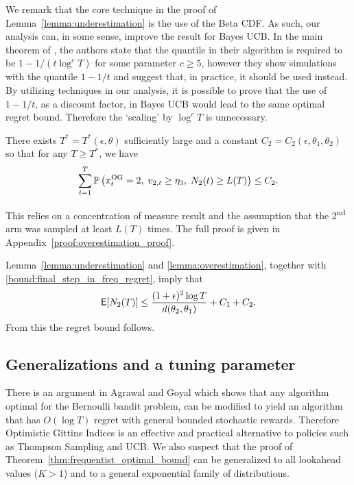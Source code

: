 \begin{myproof}[Proof.]
\begin{myproof}
		We remark that the core technique in the proof of Lemma~\ref{lemma:underestimation} is the use of the Beta CDF. As such, our analysis can, in some sense, improve the result for Bayes UCB. In the main theorem of \cite{kaufmann2012thompson}, the authors state that the quantile in their algorithm is required to be $1 - 1/(t \log^c T)$ for some parameter $c \ge 5$, however they show simulations with the quantile $1 -1/t$ and suggest that, in practice, it should be used instead. By utilizing techniques in our analysis, it is possible to prove that the use of $1-1/t$, as a discount factor, in Bayes UCB would lead to the same optimal regret bound. Therefore the `scaling' by $\log^c T$ is unnecessary.
	\end{myproof}
	\begin{lemma} \label{lemma:overestimation}
		There exists $T^* = T^*(\epsilon, \theta)$ sufficiently large and a constant $C_2 = C_2(\epsilon, \theta_1, \theta_2)$ so that for any $T \ge T^*$, we have
		\begin{equation*}
		\sum_{t=1}^T \P{\pi_t^{\rm OG} = 2,\; v_{2,t} \ge \eta_3, \; N_2(t) \ge L(T)} \le C_2.
		\end{equation*}
	\end{lemma}
	\begin{myproof}
		This relies on a concentration of measure result and the assumption that the 2\textsuperscript{nd} arm was sampled at least $L(T)$ times. The full proof is given in Appendix~\ref{proof:overestimation_proof}.
	\end{myproof}
	Lemma~\ref{lemma:underestimation} and \ref{lemma:overestimation}, together with \eqref{bound:final_step_in_freq_regret}, imply that
	\[
	\E[N_2(T)] \le \frac{(1+\epsilon)^2 \log T}{d(\theta_2, \theta_1)} +  C_1 +  C_2.
	\]
	From this the regret bound follows.
\end{myproof}
\subsection{Generalizations and a tuning parameter}
There is an argument in Agrawal and Goyal \cite{agrawalanalysis} which shows that any algorithm optimal for the Bernoulli bandit problem, can be modified to yield an algorithm that has $O(\log T)$ regret with general bounded stochastic rewards. Therefore Optimistic Gittins Indices is an effective and practical alternative to policies such as Thompson Sampling and UCB. We also suspect that the proof of Theorem~\ref{thm:frequentist_optimal_bound} can be generalized to all lookahead values ($K > 1$) and to a general exponential family of distributions.

